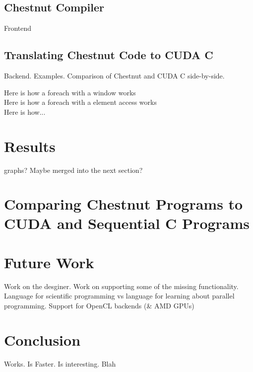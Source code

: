 \subsection{Chestnut Compiler}

Frontend

\subsection{Translating Chestnut Code to CUDA C}

Backend. Examples. Comparison of Chestnut and CUDA C side-by-side.

Here is how a foreach with a window works\\
Here is how a foreach with a element access works\\
Here is how...\\

   

\section{Results}

graphs? Maybe merged into the next section?




\section{Comparing Chestnut Programs to CUDA and Sequential C Programs}



\section{Future Work}

Work on the desginer. Work on supporting some of the missing functionality.
Language for scientific programming vs language for learning about parallel
programming. Support for OpenCL backends (\& AMD GPUs)



\section{Conclusion}

Works. Is Faster. Is interesting. Blah
